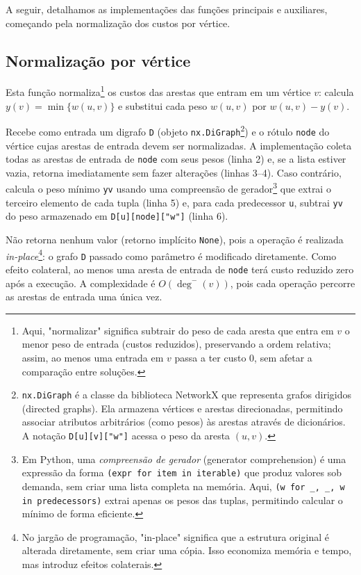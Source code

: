 A seguir, detalhamos as implementações das funções principais e auxiliares, começando pela normalização dos custos por vértice.

\subsection{Normalização por vértice}

Esta função normaliza\footnote{Aqui, "normalizar" significa subtrair do peso de cada aresta que entra em $v$ o menor peso de entrada (custos reduzidos), preservando a ordem relativa; assim, ao menos uma entrada em $v$ passa a ter custo 0, sem afetar a comparação entre soluções.} os custos das arestas que entram em um vértice \(v\): calcula \(y(v)=\min\{w(u,v)\}\) e substitui cada peso \(w(u,v)\) por \(w(u,v)-y(v)\).

Recebe como entrada um digrafo \texttt{D} (objeto \texttt{nx.DiGraph}\footnote{\texttt{nx.DiGraph} é a classe da biblioteca NetworkX que representa grafos dirigidos (directed graphs). Ela armazena vértices e arestas direcionadas, permitindo associar atributos arbitrários (como pesos) às arestas através de dicionários. A notação \texttt{D[u][v]["w"]} acessa o peso da aresta \((u,v)\).}) e o rótulo \texttt{node} do vértice cujas arestas de entrada devem ser normalizadas. A implementação coleta todas as arestas de entrada de \texttt{node} com seus pesos (linha 2) e, se a lista estiver vazia, retorna imediatamente sem fazer alterações (linhas 3--4). Caso contrário, calcula o peso mínimo \texttt{yv} usando uma compreensão de gerador\footnote{Em Python, uma \emph{compreensão de gerador} (generator comprehension) é uma expressão da forma \texttt{(expr for item in iterable)} que produz valores sob demanda, sem criar uma lista completa na memória. Aqui, \texttt{(w for \_, \_, w in predecessors)} extrai apenas os pesos das tuplas, permitindo calcular o mínimo de forma eficiente.} que extrai o terceiro elemento de cada tupla (linha 5) e, para cada predecessor \texttt{u}, subtrai \texttt{yv} do peso armazenado em \texttt{D[u][node]["w"]} (linha 6).

Não retorna nenhum valor (retorno implícito \texttt{None}), pois a operação é realizada \emph{in-place}\footnote{No jargão de programação, "in-place" significa que a estrutura original é alterada diretamente, sem criar uma cópia. Isso economiza memória e tempo, mas introduz efeitos colaterais.}: o grafo \texttt{D} passado como parâmetro é modificado diretamente. Como efeito colateral, ao menos uma aresta de entrada de \texttt{node} terá custo reduzido zero após a execução. A complexidade é \(O(\deg^-(v))\), pois cada operação percorre as arestas de entrada uma única vez.


